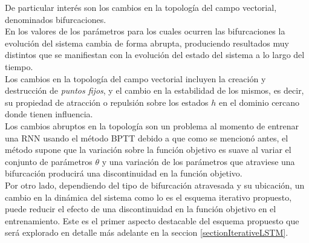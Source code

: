 \documentclass{article}
\begin{document}
	De particular interés son los cambios en la topología del campo vectorial, denominados bifurcaciones\cite{21StrogatzBook}.\\
	En los valores de los parámetros para los cuales ocurren las bifurcaciones la evolución del sistema cambia de forma abrupta, produciendo resultados muy distintos que se manifiestan con la evolución del estado del sistema a lo largo del tiempo.\\
	Los cambios en la topología del campo vectorial incluyen la creación y destrucción de \textit{puntos fijos}, y el cambio en la estabilidad de los mismos, es decir, su propiedad de atracción o repulsión sobre los estados $h$ en el dominio cercano donde tienen influencia.\\
	Los cambios abruptos en la topología son un problema al momento de entrenar una RNN usando el método BPTT debido a que como se mencionó antes, el método supone que la variación sobre la función objetivo es suave al variar el conjunto de parámetros $\theta$ y una variación de los parámetros que atraviese una bifurcación producirá una discontinuidad en la función objetivo\cite{10Pascanu}\cite{23BifurcationsDoya}.\\
	
	Por otro lado, dependiendo del tipo de bifurcación atravesada y su ubicación, un cambio en la dinámica del sistema como lo es el esquema iterativo propuesto, puede reducir el efecto de una discontinuidad en la función objetivo en el entrenamiento. Este es el primer aspecto destacable del esquema propuesto que será explorado en detalle más adelante en la seccion \ref{sectionIterativeLSTM}.\\
	
\end{document}
